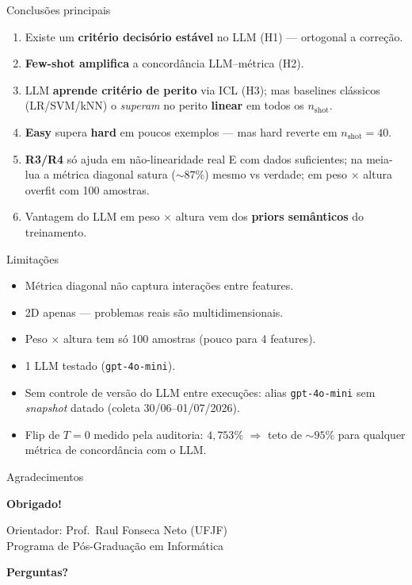\documentclass[aspectratio=169,10pt]{beamer}
\begin{document}
\begin{frame}{Conclus\~oes principais}
  \footnotesize
  \begin{enumerate}
    \item Existe um \textbf{crit\'erio decis\'orio est\'avel} no LLM (H1) --- ortogonal a corre\c{c}\~ao.
    \item \textbf{Few-shot amplifica} a concord\^ancia LLM--m\'etrica (H2).
    \item LLM \textbf{aprende crit\'erio de perito} via ICL (H3); mas baselines cl\'assicos (LR/SVM/kNN) o \emph{superam} no perito \textbf{linear} em todos os $n_{\text{shot}}$.
    \item \textbf{Easy} supera \textbf{hard} em poucos exemplos --- mas hard reverte em $n_{\text{shot}}=40$.
    \item \textbf{R3/R4} s\'o ajuda em n\~ao-linearidade real E com dados suficientes; na meia-lua a m\'etrica diagonal satura ($\sim 87\%$) mesmo vs verdade; em peso $\times$ altura overfit com 100 amostras.
    \item Vantagem do LLM em peso $\times$ altura vem dos \textbf{priors sem\^anticos} do treinamento.
  \end{enumerate}
\end{frame}

\begin{frame}{Limita\c{c}\~oes}
  \footnotesize
  \begin{itemize}
    \item M\'etrica diagonal n\~ao captura intera\c{c}\~oes entre features.
    \item 2D apenas --- problemas reais s\~ao multidimensionais.
    \item Peso $\times$ altura tem s\'o 100 amostras (pouco para 4 features).
    \item 1 LLM testado (\texttt{gpt-4o-mini}).
    \item Sem controle de vers\~ao do LLM entre execu\c{c}\~oes: alias \texttt{gpt-4o-mini} sem \emph{snapshot} datado (coleta 30/06--01/07/2026).
    \item Flip de $T{=}0$ medido pela auditoria: $4{,}753\%$ $\Rightarrow$ teto de $\sim 95\%$ para qualquer m\'etrica de concord\^ancia com o LLM.
  \end{itemize}
\end{frame}

\begin{frame}{Agradecimentos}
  \footnotesize
  \begin{center}
    \Large \textbf{Obrigado!}
    \medskip

    \normalsize
    Orientador: Prof.\ Raul Fonseca Neto (UFJF)\\
    Programa de P\'os-Gradua\c{c}\~ao em Inform\'atica
    \medskip

    \large \textbf{Perguntas?}
  \end{center}
\end{frame}
\end{document}
